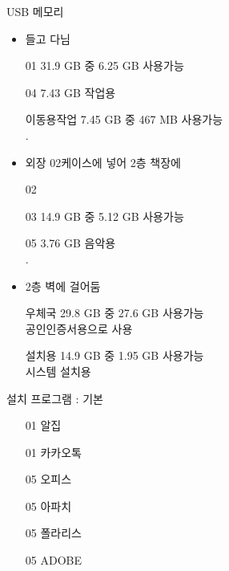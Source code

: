 \documentclass[aspectratio=1610,20pt,xcolor=pdftex,dvipsnames,table,handout]{beamer}
\begin{document}
		\begin{frame} [t,plain]


			\begin{block}  {USB 메모리 }
			\setlength{\leftmargini}{2em}			
			\begin{itemize}

				\item 들고 다님
				\item [01]		31.9 GB 중 6.25 GB 사용가능
				\item [04] 	7.43 GB 작업용 
				\item [이동용작업] 7.45 GB 중 467 MB 사용가능 \\.

				\item 외장 02케이스에 넣어 2층 책장에
				\item [02]	
				\item [03]	14.9 GB 중 5.12 GB 사용가능
				\item [05]	3.76 GB 음악용 \\.

				\item 2층 벽에 걸어둠
				\item [우체국] 29.8 GB 중 27.6 GB 사용가능 \\공인인증서용으로 사용
				\item [설치용] 14.9 GB 중 1.95 GB 사용가능 \\시스템 설치용

			\end{itemize}
			\end{block}						

		\end{frame}						

		\begin{frame} [t,plain]

			\begin{block}  {설치 프로그램 : 기본 }
			\setlength{\leftmargini}{2em}			
			\begin{itemize}
				\item [01] 알집
				\item [01] 카카오톡
				\item [05] 	오피스
				\item [05]		아파치
				\item [05] 	폴라리스
				\item [05] 	ADOBE
			\end{itemize}
			\end{block}						



		\end{frame}						
\end{document}
